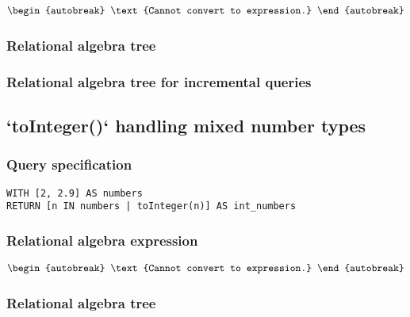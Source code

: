 \begin{align*}
\begin{autobreak}
\text{Cannot convert to expression.}
\end{autobreak}
\end{align*}

\subsubsection*{Relational algebra tree}


\subsubsection*{Relational algebra tree for incremental queries}


\subsection{`toInteger()` handling mixed number types}

\subsubsection*{Query specification}

\begin{lstlisting}
WITH [2, 2.9] AS numbers
RETURN [n IN numbers | toInteger(n)] AS int_numbers
\end{lstlisting}

\subsubsection*{Relational algebra expression}

\begin{align*}
\begin{autobreak}
\text{Cannot convert to expression.}
\end{autobreak}
\end{align*}

\subsubsection*{Relational algebra tree}


